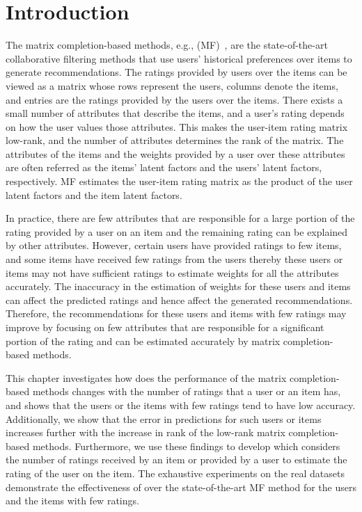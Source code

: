\section{Introduction} 
\label{ch:tmf:intro}


The matrix completion-based methods, e.g., \MF (MF)~\cite{Koren2009,
koren2008factorization, hu2008collaborative}, are the state-of-the-art
collaborative filtering methods that use users' historical preferences 
over items to generate recommendations. The ratings provided by users over
the items can be viewed as a matrix whose rows represent the users, columns
denote the items, and entries are the ratings provided by the users over the
items.  There exists a small number of attributes that describe the items, and
a user's rating depends on how the user values those attributes. This makes the
user-item rating matrix low-rank, and the number of attributes determines the
rank of the matrix. The attributes of the items and the weights provided by
a user over these attributes are often referred as the items' latent factors
and the users' latent factors, respectively. MF estimates the user-item rating
matrix as the product of the user latent factors and the item latent factors.  


In practice, there are few attributes that are responsible for a large
portion of the rating provided by a user on an item and the remaining rating
can be explained by other attributes. However, certain users have provided
ratings to few items, and some items have received few ratings from the users
thereby these users or items may not have sufficient ratings to estimate weights
for all the attributes accurately. The inaccuracy in the estimation of weights
for these users and items can affect the predicted ratings and hence affect
the generated recommendations. Therefore, the recommendations for these users
and items with few ratings may improve by focusing on few attributes that
are responsible for a significant portion of the rating and can be estimated
accurately by matrix completion-based methods.


This chapter investigates how does the performance of the matrix
completion-based methods changes with the number of ratings that a
user or an item has, and shows that the users or the items with few
ratings tend to have low accuracy. Additionally, we show that the error
in predictions for such users or items increases further with the 
increase in rank of the low-rank matrix completion-based methods. 
Furthermore, we use these findings to develop \TMF which considers the number of
ratings received by an item or provided by a user to estimate the rating of the
user on the item. 
The exhaustive experiments on the real datasets demonstrate the effectiveness of
\TMF over the state-of-the-art MF method for the users and the items with few
ratings.





